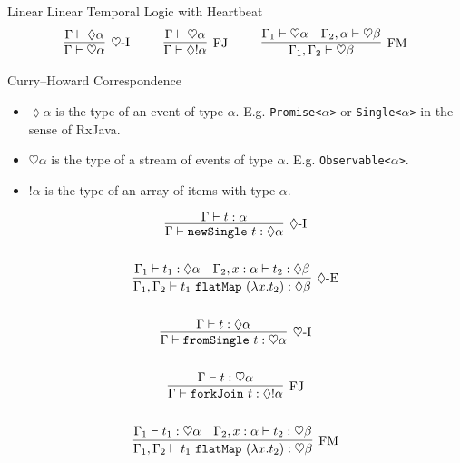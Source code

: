 \documentclass[final]{beamer}
\newlength{\colwidth}
\begin{document}
\begin{frame}[t]
\begin{columns}[t]
\begin{column}{\colwidth}
\begin{block}{Linear Linear Temporal Logic with Heartbeat}
    \begin{gather*}
    \infer[\heartsuit\mbox{-I}]{\Gamma \vdash \heartsuit\alpha}{\Gamma \vdash \lozenge\alpha}
    ~~~~ ~~~~
    \infer[\mbox{FJ}]{\Gamma \vdash \lozenge!\alpha}{\Gamma \vdash \heartsuit\alpha}
    ~~~~ ~~~~
    \infer[\mbox{FM}]{\Gamma_1, \Gamma_2 \vdash \heartsuit\beta}{
        \Gamma_1 \vdash \heartsuit\alpha
        &
        \Gamma_2, \alpha \vdash \heartsuit\beta
    }
    \end{gather*}
    
  \end{block}
  
  \begin{block}{Curry--Howard Correspondence}
    \begin{itemize}
        \item $\lozenge\alpha$ is the type of an event of type $\alpha$. E.g. \texttt{Promise<}$\alpha$\texttt{>} or \texttt{Single<}$\alpha$\texttt{>} in the sense of RxJava.
        
        \item $\heartsuit\alpha$ is the type of a stream of events of type $\alpha$. E.g. \texttt{Observable<}$\alpha$\texttt{>}.
        
        \item $!\alpha$ is the type of an array of items with type $\alpha$.
    \end{itemize}
  
    \begin{gather*}
    \infer[\lozenge\mbox{-I}]{\Gamma \vdash \mathtt{newSingle}~t : \lozenge\alpha}{\Gamma \vdash t : \alpha}
    \\ \\
    \infer[\lozenge\mbox{-E}]{\Gamma_1, \Gamma_2 \vdash t_1~\mathtt{flatMap}~(\lambda x. t_2) : \lozenge\beta}{
        \Gamma_1 \vdash t_1 : \lozenge\alpha
        &
        \Gamma_2, x : \alpha \vdash t_2 : \lozenge\beta
    }
    \\ \\
    \infer[\heartsuit\mbox{-I}]{\Gamma \vdash \mathtt{fromSingle}~t : \heartsuit\alpha}{\Gamma \vdash t : \lozenge\alpha}
    \\ \\
    \infer[\mbox{FJ}]{\Gamma \vdash \mathtt{forkJoin}~t : \lozenge!\alpha}{\Gamma \vdash t : \heartsuit\alpha}
    \\ \\
    \infer[\mbox{FM}]{\Gamma_1, \Gamma_2 \vdash t_1~\mathtt{flatMap}~(\lambda x. t_2) : \heartsuit\beta}{
        \Gamma_1 \vdash t_1 : \heartsuit\alpha
        &
        \Gamma_2, x : \alpha \vdash t_2 : \heartsuit\beta
    }
    \end{gather*}
    

\end{block}
\end{column}
\end{columns}
\end{frame}
\end{document}
